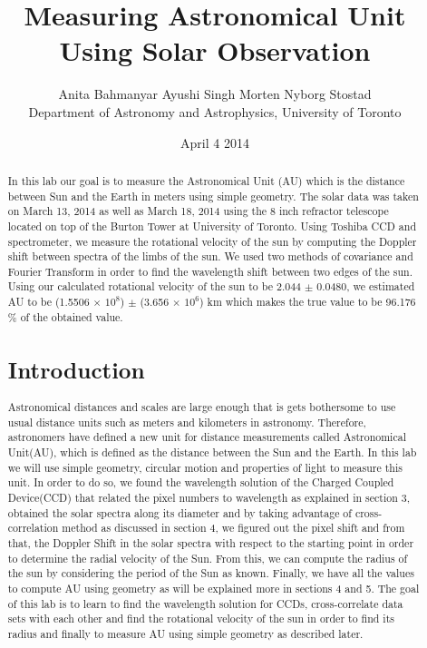\documentclass[letterpaper,12pt]{article}
\title{Measuring Astronomical Unit Using Solar Observation}
\author{Anita Bahmanyar \qquad Ayushi Singh \qquad Morten Nyborg Stostad \\Department of Astronomy and Astrophysics, University of Toronto}
\affil{\small {Written by: Anita Bahmanyar}}
\affil{\small {anita.bahmanyar@mail.utoronto.ca}}
\affil{\small {Student Number: 998909098}}
\date{April 4 2014}
\begin{document}
\maketitle

\begin{abstract}
\label{abstract}
In this lab our goal is to measure the Astronomical Unit (AU) which is the distance between Sun and the Earth in meters using simple geometry. The solar data was taken on March 13, 2014 as well as March 18, 2014 using the 8 inch refractor telescope located on top of the Burton Tower at University of Toronto. Using Toshiba CCD and spectrometer, we measure the rotational velocity of the sun by computing the Doppler shift between spectra of the limbs of the sun. We used two methods of covariance and Fourier Transform in order to find the wavelength shift between two edges of the sun. Using our calculated rotational velocity of the sun to be 2.044 $\pm$ 0.0480, we estimated AU to be (1.5506 $\times$ $10^{8}$) $\pm$ (3.656 $\times$ $10^6$) km which makes the true value to be 96.176 \% of the obtained value.

\section{Introduction}
\label{sec:introduction}
Astronomical distances and scales are large enough that is gets bothersome to use usual distance units such as meters and kilometers in astronomy. Therefore, astronomers have defined a new unit for distance measurements called Astronomical Unit(AU), which is defined as the distance between the Sun and the Earth. In this lab we will use simple geometry, circular motion and properties of light to measure this unit. In order to do so, we found the wavelength solution of the Charged Coupled Device(CCD) that related the pixel numbers to wavelength as explained in section 3, obtained the solar spectra along its diameter and by taking advantage of cross-correlation method as discussed in section 4, we figured out the pixel shift and from that, the Doppler Shift in the solar spectra with respect to the starting point in order to determine the radial velocity of the Sun. From this, we can compute the radius of the sun by considering the period of the Sun as known. Finally, we have all the values to compute AU using geometry as will be explained more in sections 4 and 5. The goal of this lab is to learn to find the wavelength solution for CCDs, cross-correlate data sets with each other and find the rotational velocity of the sun in order to find its radius and finally to measure AU using simple geometry as described later.



\end{abstract}
\end{document}
